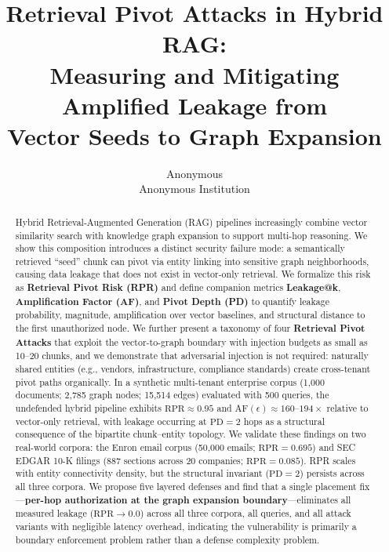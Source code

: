 \documentclass[letterpaper,twocolumn,10pt]{article}
\begin{document}
\date{}

\title{\Large \bf Retrieval Pivot Attacks in Hybrid RAG:\\
Measuring and Mitigating Amplified Leakage from\\
Vector Seeds to Graph Expansion}

\author{
{\rm Anonymous}\\
Anonymous Institution
}

\maketitle

\begin{abstract}
Hybrid Retrieval-Augmented Generation (RAG) pipelines increasingly
combine vector similarity search with knowledge graph expansion to
support multi-hop reasoning. We show this composition introduces a
distinct security failure mode: a semantically retrieved ``seed'' chunk
can pivot via entity linking into sensitive graph neighborhoods,
causing data leakage that does not exist in vector-only retrieval. We
formalize this risk as \textbf{Retrieval Pivot Risk (RPR)} and define
companion metrics \textbf{Leakage@k}, \textbf{Amplification Factor
(AF)}, and \textbf{Pivot Depth (PD)} to quantify leakage probability,
magnitude, amplification over vector baselines, and structural distance
to the first unauthorized node. We further present a taxonomy of four
\textbf{Retrieval Pivot Attacks} that exploit the vector-to-graph
boundary with injection budgets as small as 10--20 chunks, and we
demonstrate that adversarial injection is not required: naturally
shared entities (e.g., vendors, infrastructure, compliance standards)
create cross-tenant pivot paths organically. In a synthetic
multi-tenant enterprise corpus (1{,}000 documents; 2{,}785 graph
nodes; 15{,}514 edges) evaluated with 500 queries, the undefended
hybrid pipeline exhibits $\text{RPR} \approx 0.95$ and
$\text{AF}(\epsilon) \approx 160\text{--}194\times$ relative to
vector-only retrieval, with leakage occurring at $\text{PD} = 2$ hops
as a structural consequence of the bipartite chunk--entity topology.
We validate these findings on two real-world corpora: the Enron email
corpus (50{,}000 emails; $\text{RPR} = 0.695$) and SEC EDGAR 10-K
filings (887 sections across 20 companies; $\text{RPR} = 0.085$).
RPR scales with entity connectivity density, but the structural
invariant ($\text{PD} = 2$) persists across all three corpora.
We propose five layered defenses and find that a single placement
fix---\textbf{per-hop authorization at the graph expansion
boundary}---eliminates all measured leakage ($\text{RPR} \to 0.0$)
across all three corpora, all queries, and all attack variants with
negligible latency overhead, indicating the vulnerability is primarily
a boundary enforcement problem rather than a defense complexity
problem.
\end{abstract}
\end{document}
